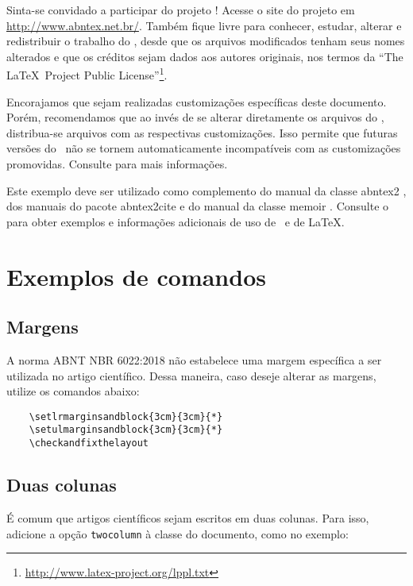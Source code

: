 \documentclass[
	article,			
	11pt,				
	oneside,			
	a4paper,			
	english,			
	brazil,				
	sumario=tradicional
	]{abntex2}
\begin{document}
Sinta-se convidado a participar do projeto \abnTeX! Acesse o site do projeto em
\url{http://www.abntex.net.br/}. Também fique livre para conhecer,
estudar, alterar e redistribuir o trabalho do \abnTeX, desde que os arquivos
modificados tenham seus nomes alterados e que os créditos sejam dados aos
autores originais, nos termos da ``The \LaTeX\ Project Public
License''\footnote{\url{http://www.latex-project.org/lppl.txt}}.

Encorajamos que sejam realizadas customizações específicas deste documento.
Porém, recomendamos que ao invés de se alterar diretamente os arquivos do
\abnTeX, distribua-se arquivos com as respectivas customizações. Isso permite
que futuras versões do \abnTeX~não se tornem automaticamente incompatíveis com
as customizações promovidas. Consulte 
para mais informações.

Este exemplo deve ser utilizado como complemento do manual da classe
\textsf{abntex2} \cite{abntex2classe}, dos manuais do pacote
\textsf{abntex2cite} \cite{abntex2cite,abntex2cite-alf} e do manual da classe
\textsf{memoir} \cite{memoir}. Consulte o  para obter
exemplos e informações adicionais de uso de \abnTeX\ e de \LaTeX.

\section{Exemplos de comandos}

\subsection{Margens}

A norma ABNT NBR 6022:2018 não estabelece uma margem específica a ser utilizada
no artigo científico. Dessa maneira, caso deseje alterar as margens, utilize os
comandos abaixo:

\begin{verbatim}
    \setlrmarginsandblock{3cm}{3cm}{*}
    \setulmarginsandblock{3cm}{3cm}{*}
    \checkandfixthelayout
\end{verbatim}

\subsection{Duas colunas}

É comum que artigos científicos sejam escritos em duas colunas. Para isso,
adicione a opção \texttt{twocolumn} à classe do documento, como no exemplo:
\end{document}
